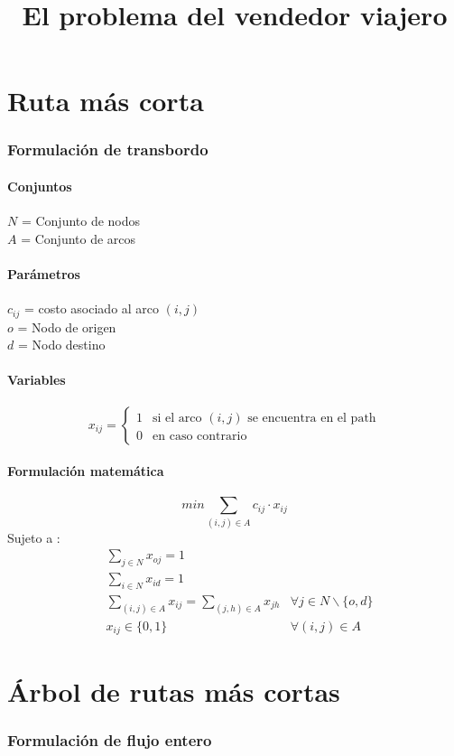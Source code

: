 \documentclass{article}
\title{El problema del vendedor viajero}
\numberwithin{equation}{section}
\begin{document}
\part{Ruta más corta}
\section{Formulación de transbordo}
\subsection{Conjuntos}
$N$ = Conjunto de nodos\\
$A$ = Conjunto de arcos
\subsection{Parámetros}
$c_{ij}$ = costo asociado al arco $(i,j)$\\
$o$ = Nodo de origen\\
$d$ = Nodo destino
\subsection{Variables}
\begin{flushleft}
\[x_{ij}={\begin{cases}1&{\mbox{si el arco $(i,j)$ se encuentra en el path}}\\0&{\mbox{en caso contrario}}\end{cases}}
\]
\end{flushleft}
\subsection{Formulación matemática}
\begin{equation}
min \sum_{(i,j) \in A} c_{ij} \cdot x_{ij}
\end{equation}
Sujeto a : \begin{align}
& \sum_{j \in N} x_{oj} = 1 \\
& \sum_{i \in N} x_{id} = 1 \\
& \sum_{(i,j) \in A} x_{ij} = \sum_{(j,h) \in A} x_{jh} &\forall j \in N \backslash \{o,d\} \\
& x_{ij} \in \{0,1\} &\forall (i,j) \in A
\end{align}

\newpage
\part{Árbol de rutas más cortas}
\section{Formulación de flujo entero}
\end{document}
